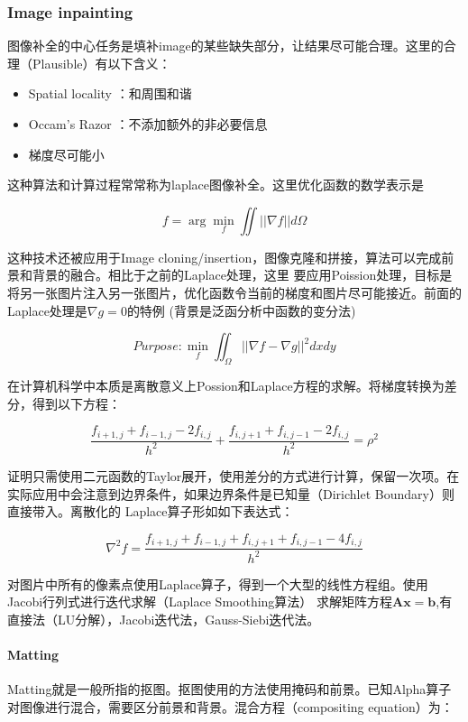 \subsubsection{Image inpainting}

图像补全的中心任务是填补image的某些缺失部分，让结果尽可能合理。这里的合理（Plausible）有以下含义：

\begin{itemize}
    \item Spatial locality ：和周围和谐
    \item Occam’s Razor ：不添加额外的非必要信息
    \item 梯度尽可能小
\end{itemize}

这种算法和计算过程常常称为laplace图像补全。这里优化函数的数学表示是

\[
f = \arg \min_f \iint ||\nabla f|| d\Omega
\]

这种技术还被应用于Image cloning/insertion，图像克隆和拼接，算法可以完成前景和背景的融合。相比于之前的Laplace处理，这里
要应用Poission处理，目标是将另一张图片注入另一张图片，优化函数令当前的梯度和图片尽可能接近。前面的Laplace处理是$\nabla g = 0$的特例
(背景是泛函分析中函数的变分法)

\[
Purpose: \min_f \iint_{\Omega} ||\nabla f - \nabla g|| ^ 2 dxdy
\]

在计算机科学中本质是离散意义上Possion和Laplace方程的求解。将梯度转换为差分，得到以下方程：

\[
\frac{f_{i+1,j} + f_{i-1,j} - 2f_{i,j}}{h^2} + \frac{f_{i,j+1} + f_{i,j-1} - 2f_{i,j}}{h^2} = \rho^2
\]

证明只需使用二元函数的Taylor展开，使用差分的方式进行计算，保留一次项。在实际应用中会注意到边界条件，如果边界条件是已知量（Dirichlet Boundary）则直接带入。离散化的
Laplace算子形如如下表达式：

\[
\nabla^2 f = \frac{f_{i+1,j} + f_{i-1,j} + f_{i,j+1} + f_{i,j-1} - 4f_{i,j}
}{h^2}
\]

对图片中所有的像素点使用Laplace算子，得到一个大型的线性方程组。使用Jacobi行列式进行迭代求解（Laplace Smoothing算法）
求解矩阵方程$\mathbf{Ax} = \mathbf{b}$,有直接法（LU分解），Jacobi迭代法，Gauss-Siebi迭代法。

\paragraph{Matting}

Matting就是一般所指的抠图。抠图使用的方法使用掩码和前景。已知Alpha算子对图像进行混合，需要区分前景和背景。混合方程（compositing equation）为：

